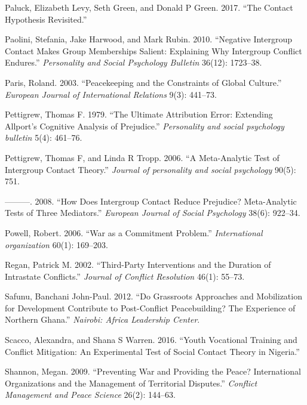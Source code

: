 \documentclass[11pt]{article}
\begin{document}
\hypertarget{ref-paluck2017contact}{}
Paluck, Elizabeth Levy, Seth Green, and Donald P Green. 2017. ``The
Contact Hypothesis Revisited.''

\hypertarget{ref-paolini2010negative}{}
Paolini, Stefania, Jake Harwood, and Mark Rubin. 2010. ``Negative
Intergroup Contact Makes Group Memberships Salient: Explaining Why
Intergroup Conflict Endures.'' \emph{Personality and Social Psychology
Bulletin} 36(12): 1723--38.

\hypertarget{ref-paris2003peacekeeping}{}
Paris, Roland. 2003. ``Peacekeeping and the Constraints of Global
Culture.'' \emph{European Journal of International Relations} 9(3):
441--73.

\hypertarget{ref-pettigrew1979ultimate}{}
Pettigrew, Thomas F. 1979. ``The Ultimate Attribution Error: Extending
Allport's Cognitive Analysis of Prejudice.'' \emph{Personality and
social psychology bulletin} 5(4): 461--76.

\hypertarget{ref-pettigrew2006meta}{}
Pettigrew, Thomas F, and Linda R Tropp. 2006. ``A Meta-Analytic Test of
Intergroup Contact Theory.'' \emph{Journal of personality and social
psychology} 90(5): 751.

\hypertarget{ref-pettigrew2008does}{}
---------. 2008. ``How Does Intergroup Contact Reduce Prejudice?
Meta-Analytic Tests of Three Mediators.'' \emph{European Journal of
Social Psychology} 38(6): 922--34.

\hypertarget{ref-powell2006war}{}
Powell, Robert. 2006. ``War as a Commitment Problem.''
\emph{International organization} 60(1): 169--203.

\hypertarget{ref-regan2002third}{}
Regan, Patrick M. 2002. ``Third-Party Interventions and the Duration of
Intrastate Conflicts.'' \emph{Journal of Conflict Resolution} 46(1):
55--73.

\hypertarget{ref-safunu2012grassroots}{}
Safunu, Banchani John-Paul. 2012. ``Do Grassroots Approaches and
Mobilization for Development Contribute to Post-Conflict Peacebuilding?
The Experience of Northern Ghana.'' \emph{Nairobi: Africa Leadership
Center}.

\hypertarget{ref-Scacco2016}{}
Scacco, Alexandra, and Shana S Warren. 2016. ``Youth Vocational Training
and Conflict Mitigation: An Experimental Test of Social Contact Theory
in Nigeria.''

\hypertarget{ref-shannon2009preventing}{}
Shannon, Megan. 2009. ``Preventing War and Providing the Peace?
International Organizations and the Management of Territorial
Disputes.'' \emph{Conflict Management and Peace Science} 26(2): 144--63.
\end{document}
